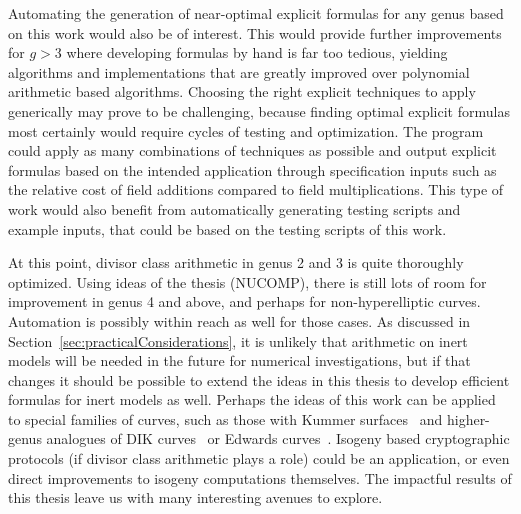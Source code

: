 Automating the generation of near-optimal explicit formulas for any genus based
on this work would also be of interest. This would provide further improvements for
$g > 3$ where developing formulas by hand is far too tedious, yielding
algorithms and implementations that are greatly improved over polynomial
arithmetic based algorithms. Choosing the right explicit techniques to apply
generically may prove to be challenging, because finding optimal explicit formulas
most certainly would require cycles of testing and optimization. The program
could apply as many combinations of techniques as possible and output explicit
formulas based on the intended application through specification inputs such as
the relative cost of field additions compared to field multiplications. This
type of work would also benefit from automatically generating testing scripts and
example inputs, that could be based on the testing scripts of this work.

At this point, divisor class arithmetic in genus 2 and 3 is quite thoroughly
optimized. Using ideas of the thesis (NUCOMP), there is still lots of room for
improvement in genus 4 and above, and perhaps for non-hyperelliptic curves.
Automation is possibly within reach as well for those cases. As discussed in
Section~\ref{sec:practicalConsiderations}, it is unlikely that arithmetic on
inert models will be needed in the future for numerical investigations, but if
that changes it should be possible to extend the ideas in this thesis to develop
efficient formulas for inert models as well. Perhaps the ideas of this work can
be applied to special families of curves, such as those with Kummer
surfaces~\cite{Gaudry_kummer_2007} and higher-genus analogues of DIK
curves~\cite{Doche_DIK_2006} or Edwards curves~\cite{edwards2007normal}. Isogeny
based cryptographic protocols (if divisor class arithmetic plays a role) could
be an application, or even direct improvements to isogeny computations
themselves. The impactful results of this thesis leave us with many interesting
avenues to explore.